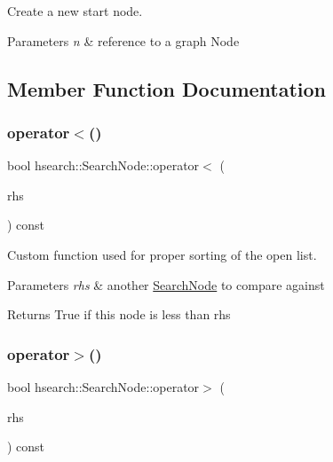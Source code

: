 Create a new start node. 


\begin{DoxyParams}{Parameters}
{\em n} & reference to a graph Node \\
\hline
\end{DoxyParams}


\subsection{Member Function Documentation}
\mbox{\label{structhsearch_1_1SearchNode_a936d6ea25917367b88adde4748c9143c}} 
\subsubsection{\texorpdfstring{operator$<$()}{operator<()}}
{\footnotesize\ttfamily bool hsearch\+::\+Search\+Node\+::operator$<$ (\begin{DoxyParamCaption}\item[{const \hyperlink{structhsearch_1_1SearchNode}{Search\+Node} \&}]{rhs }\end{DoxyParamCaption}) const}



Custom function used for proper sorting of the open list. 


\begin{DoxyParams}{Parameters}
{\em rhs} & another \hyperlink{structhsearch_1_1SearchNode}{Search\+Node} to compare against \\
\hline
\end{DoxyParams}
\begin{DoxyReturn}{Returns}
True if this node is less than rhs 
\end{DoxyReturn}
\mbox{\label{structhsearch_1_1SearchNode_a492955fe1a5cdfae1dc0474232cb7175}} 
\subsubsection{\texorpdfstring{operator$>$()}{operator>()}}
{\footnotesize\ttfamily bool hsearch\+::\+Search\+Node\+::operator$>$ (\begin{DoxyParamCaption}\item[{const \hyperlink{structhsearch_1_1SearchNode}{Search\+Node} \&}]{rhs }\end{DoxyParamCaption}) const}



